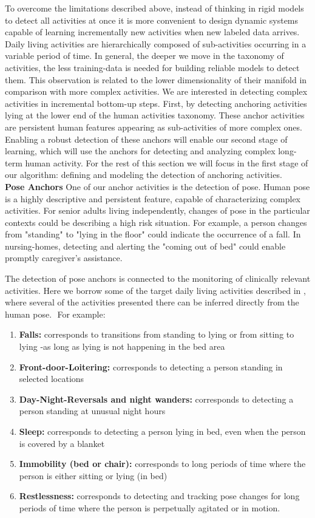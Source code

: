 \documentclass[oneside, twocolumn]{article}
\begin{document}
To overcome the limitations described above, instead of thinking in rigid models to detect all activities at once
it is more convenient to design dynamic systems capable of learning incrementally new activities when new labeled
data arrives.  Daily living activities are hierarchically composed of sub-activities occurring in a variable period
of time. In general, the deeper we move in the taxonomy of activities, the less training-data is needed for building
reliable models to detect them. This observation is related to the lower dimensionality of their manifold in comparison
with more complex activities. We are interested in detecting complex activities in incremental bottom-up steps. First,
by detecting anchoring activities lying at the lower end of the human activities taxonomy. These anchor activities are
persistent human features appearing as sub-activities of more complex ones.  Enabling a robust detection of these
anchors will enable our second stage of learning, which will use the anchors for detecting and analyzing complex
long-term human activity.  For the rest of this section we will focus in the first stage of our algorithm: defining
and modeling the detection of anchoring activities.\\

\textbf{Pose Anchors} One of our anchor activities is the detection of pose. Human pose  is a highly descriptive
and persistent feature, capable  of  characterizing complex activities. For senior adults living independently,
changes of pose in the particular contexts could be describing a high risk situation. For  example,  a person changes
from "standing" to "lying in the floor" could indicate the  occurrence  of a fall. In nursing-homes, detecting and
alerting the "coming out of bed" could enable promptly caregiver's assistance.

The detection of pose anchors is connected to the monitoring of clinically relevant activities. Here we borrow some
of the target daily living  activities  described in \cite{pac_stanford}, where several of the activities presented
there can be inferred directly from the human pose.
​
For example:
\begin{enumerate}
	\item \textbf{Falls:} corresponds to transitions from standing to lying or from sitting to lying -as long as lying is not happening in the bed area
	\item \textbf{Front-door-Loitering:} corresponds to detecting a person standing in selected locations
	\item \textbf{Day-Night-Reversals and night wanders:} corresponds to detecting a person standing at unusual night hours
	\item \textbf{Sleep:} corresponds to detecting a person lying in bed, even when the person is covered by a blanket
	\item \textbf{Immobility (bed or chair):} corresponds to long periods of time where the person is either sitting or lying (in bed)
	\item \textbf{Restlessness:} corresponds to detecting and tracking pose changes for long periods of time where the person is perpetually agitated or in motion.
\end{enumerate}
\end{document}
